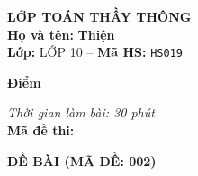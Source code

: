 \noindent
\begin{tcolorbox}[colback=white,colframe=black,arc=0mm,boxrule=0.8pt,top=4pt,bottom=4pt,left=6pt,right=6pt]
	\begin{minipage}[c]{0.44\textwidth}
		{\bfseries\large LỚP TOÁN THẦY THÔNG}\\[3pt]
		\textbf{Họ và tên:} \textbf{\large Thiện}\\[3pt]
		\textbf{Lớp:} LỚP 10 \quad -- \quad \textbf{Mã HS:} \texttt{HS019}
	\end{minipage}
	\hfill
	\begin{minipage}[c]{0.22\textwidth}
		\begin{tcolorbox}[colback=white,colframe=black,arc=0mm,boxrule=0.6pt,height=1.8cm,halign=center,valign=top,top=2pt]
			{\bfseries\normalsize Điểm}
		\end{tcolorbox}
	\end{minipage}
	\hfill
	\begin{minipage}[c]{0.30\textwidth}
		\raggedleft
		\textit{Thời gian làm bài: 30 phút}\\[4pt]
		\textbf{Mã đề thi:} 
	\end{minipage}
\end{tcolorbox}
\vspace{0.25cm}

\noindent\textbf{\large ĐỀ BÀI (MÃ ĐỀ: 002)}
\vspace{0.1cm}

